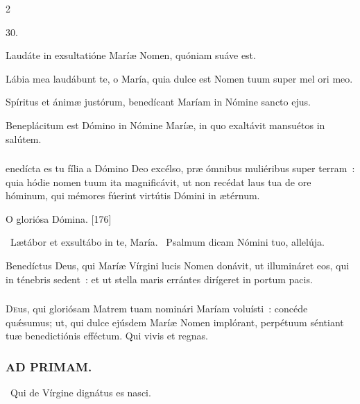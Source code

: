 \documentclass[9pt,twoside]{extarticle}
\begin{document}
\begin{multicols}{2}
{\begin{tightlist}{}
\item {} 30.
\item {} Laudáte in exsultatióne Maríæ Nomen, quóniam suáve est.
\item {} Lábia mea laudábunt te, o María, quia dulce est Nomen tuum super mel ori meo.
\item {} Spíritus et ánimæ justórum, benedícant Maríam in Nómine sancto ejus.
\item {} Beneplácitum est Dómino in Nómine Maríæ, in quo exaltávit mansuétos in salútem.
\end{tightlist}

\subsubsection*{}
enedícta es tu fília a Dómino Deo excélso, præ ómnibus muliéribus super terram~: quia hódie nomen tuum ita magnificávit, ut non recédat laus tua de ore hóminum, qui mémores fúerint virtútis Dómini in ætérnum.

\begin{tightlist}{}
\item {} O gloriósa Dómina. [176]
\item {}~Lætábor et exsultábo in te, María. ~Psalmum dicam Nómini tuo, allelúja.
\item {} Benedíctus Deus, qui Maríæ Vírgini lucis Nomen donávit, ut illumináret eos, qui in ténebris sedent~: et ut stella maris errántes dirígeret in portum pacis.
\end{tightlist}

\subsubsection*{\center {}}
\lettrine{D}eus, qui gloriósam Matrem tuam nominári Maríam voluísti~: concéde quǽsumus; ut, qui dulce ejúsdem Maríæ Nomen implórant, perpétuum séntiant tuæ benedictiónis efféctum. Qui vivis et regnas.

\subsubsection*{\center \textsc{AD PRIMAM.}}
\begin{tightlist}{}
\item {}
\item {}~Qui de Vírgine dignátus es nasci.
\end{tightlist}

}
\end{multicols}
\end{document}
